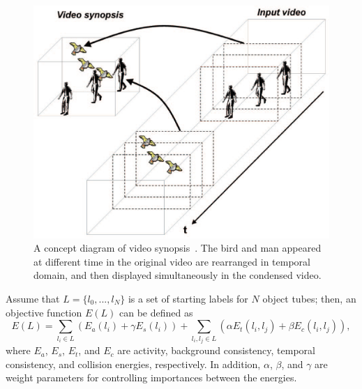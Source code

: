 \documentclass[11pt]{hyu_thesis}
\begin{document}
\begin{figure}
\begin{center}
\includegraphics[width=\linewidth]{video_synopsis.eps}
\end{center}
\caption{A concept diagram of video synopsis~\cite{Pritch2009}. The bird and man appeared at different time in the original video are rearranged in temporal domain, and then displayed simultaneously in the condensed video.}
\label{fig:video_synopsis}
\end{figure}

Assume that $L=\{l_0,...,l_N\}$ is a set of starting labels for $N$ object tubes; then, an objective function $E(L)$ can be defined as
\begin{equation}
\label{eq:basic_form}
E(L)=\sum_{l_i \in L} ( E_a(l_i) + \gamma E_s(l_i) ) + \sum_{l_i,l_j \in L} ( \alpha E_t(l_i, l_j) + \beta E_c(l_i, l_j) ),
\end{equation}
where $E_a$, $E_s$, $E_t$, and $E_c$ are activity, background consistency, temporal consistency, and collision energies, respectively. In addition, $\alpha$, $\beta$, and $\gamma$ are weight parameters for controlling importances between the energies.
\end{document}
